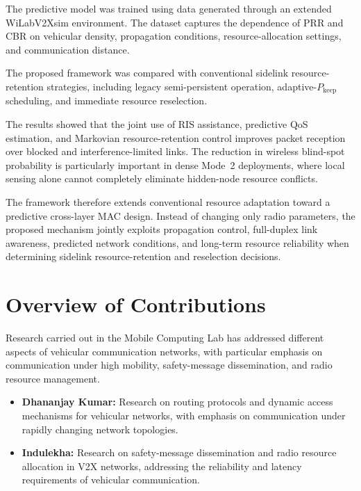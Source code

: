 The predictive model was trained using data generated through an extended
WiLabV2Xsim environment. The dataset captures the dependence of PRR and
CBR on vehicular density, propagation conditions, resource-allocation
settings, and communication distance.

The proposed framework was compared with conventional sidelink
resource-retention strategies, including legacy semi-persistent operation,
adaptive-$P_{\mathrm{keep}}$ scheduling, and immediate resource
reselection.

The results showed that the joint use of RIS assistance, predictive QoS
estimation, and Markovian resource-retention control improves packet
reception over blocked and interference-limited links. The reduction in
wireless blind-spot probability is particularly important in dense
Mode~2 deployments, where local sensing alone cannot completely eliminate
hidden-node resource conflicts.

The framework therefore extends conventional resource adaptation toward a
predictive cross-layer MAC design. Instead of changing only radio
parameters, the proposed mechanism jointly exploits propagation control,
full-duplex link awareness, predicted network conditions, and long-term
resource reliability when determining sidelink resource-retention and
reselection decisions.




\section{Overview of Contributions}
\label{sec:vehicular_contributions}

Research carried out in the Mobile Computing Lab has addressed different
aspects of vehicular communication networks, with particular emphasis on
communication under high mobility, safety-message dissemination, and radio
resource management.

\begin{itemize}

    \item \textbf{Dhananjay Kumar:}
    Research on routing protocols and dynamic access mechanisms for vehicular
    networks, with emphasis on communication under rapidly changing network
    topologies.

    \item \textbf{Indulekha:}
    Research on safety-message dissemination and radio resource allocation in
    V2X networks, addressing the reliability and latency requirements of
    vehicular communication.

\end{itemize}

